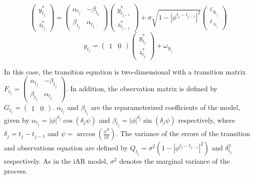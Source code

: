 \begin{equation}
\left(\begin{array}{c} y_{t_j}^{*} \\  z_{t_j}^{*} \end{array} \right)= \left(\begin{array}{cc} \alpha_{t_j}  & -\beta_{t_j} \\ \beta_{t_j} & \alpha_{t_j} \end{array} \right)\left(\begin{array}{c} y_{t_{j-1}}^{*} \\  z_{t_{j-1}}^{*} \end{array} \right) + \sigma \sqrt{1-\left|\phi^{t_j-t_{j-1}}\right|^2} \left(\begin{array}{c} \varepsilon_{y_{t_j}} \\ \varepsilon_{z_{t_j}} \end{array} \right)
\label{eq:CIARSS}
\end{equation}
\begin{equation}
y_{t_j}  = \left(\begin{array}{cc} 1 & 0 \end{array} \right) \left(\begin{array}{c} y_{t_j}^{*}  \\  z_{t_j}^{*}  \end{array} \right) +  \omega_{y_{t_j}}
\label{eq:CIARSS2}
\end{equation}

In this case, the transition equation is two-dimensional with a transition matrix \(F_{t_j} = \left(\begin{array}{cc} \alpha_{t_j} & -\beta_{t_j} \\ \beta_{t_j} & \alpha_{t_j} \end{array} \right)\). In addition, the observation matrix is defined by \(G_{t_j}=\left(\begin{array}{cc} 1 & 0 \end{array} \right)\). \(\alpha_{t_j}\) and \(\beta_{t_j}\) are the reparameterized coefficients of the model, given by \(\alpha_{t_j} = |\phi|^{\delta_{j}} \cos(\delta_{j} \psi)\) and \(\beta_{t_j} = |\phi|^{\delta_{j}} \sin(\delta_{j} \psi)\) respectively, where \(\delta_{j} = t_j-t_{j-1}\) and \(\psi = \arccos\left( \frac{\phi^{R}}{|\phi|}\right)\). The variance of the errors of the transition and observations equation are defined by \(Q_{t_j} = \sigma^2(1-\left|\phi^{t_j-t_{j-1}}\right|^2)\) and \(\delta^2_{t_j}\) respectively. As in the iAR model, \(\sigma^2\) denotes the marginal variance of the process.

